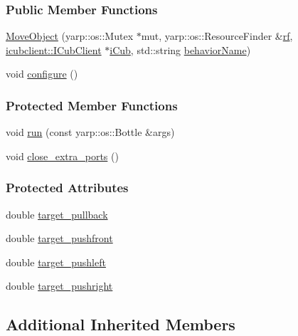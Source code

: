 \subsubsection*{Public Member Functions}
\begin{DoxyCompactItemize}
\item 
\hyperlink{group__behaviorManager_a3b1bea83b099178491e8f82ec99497b3}{Move\+Object} (yarp\+::os\+::\+Mutex $\ast$mut, yarp\+::os\+::\+Resource\+Finder \&\hyperlink{group__behaviorManager_a789254580a094846e91a9892fa2bc4cd}{rf}, \hyperlink{group__icubclient__clients_classicubclient_1_1ICubClient}{icubclient\+::\+I\+Cub\+Client} $\ast$\hyperlink{group__behaviorManager_a5ab3f49bb3a40d79fe2b4aeb76e12196}{i\+Cub}, std\+::string \hyperlink{group__behaviorManager_aad9d5bf2f1f1e9c6902a4f40b03c4e67}{behavior\+Name})
\item 
void \hyperlink{group__behaviorManager_a5e068840a2d5f5fbeafc61b075f63804}{configure} ()
\end{DoxyCompactItemize}
\subsubsection*{Protected Member Functions}
\begin{DoxyCompactItemize}
\item 
void \hyperlink{group__behaviorManager_a2e242410f34618b2ff73f9106732470b}{run} (const yarp\+::os\+::\+Bottle \&args)
\item 
void \hyperlink{group__behaviorManager_a98277199c0056a8062184b7c969da0a5}{close\+\_\+extra\+\_\+ports} ()
\end{DoxyCompactItemize}
\subsubsection*{Protected Attributes}
\begin{DoxyCompactItemize}
\item 
double \hyperlink{group__behaviorManager_af15f2e56d8d27f8534f3d34cc2ad48cd}{target\+\_\+pullback}
\item 
double \hyperlink{group__behaviorManager_a066b8e89a77ee162e63d08e9efdba98d}{target\+\_\+pushfront}
\item 
double \hyperlink{group__behaviorManager_a778488ee5c597654f7c19f949fe268fa}{target\+\_\+pushleft}
\item 
double \hyperlink{group__behaviorManager_aa6797d5e798ae11c3ecd7c8cb6f3691c}{target\+\_\+pushright}
\end{DoxyCompactItemize}
\subsection*{Additional Inherited Members}


